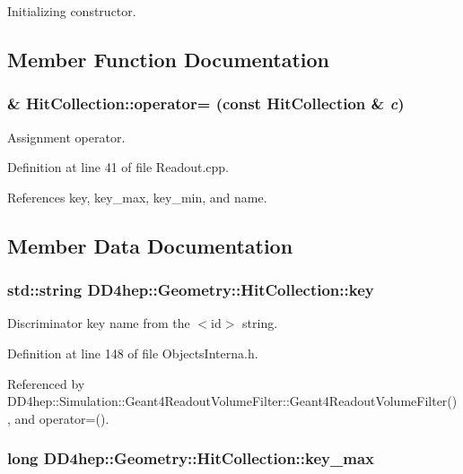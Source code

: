 Initializing constructor. 

\subsection{Member Function Documentation}
\hypertarget{class_d_d4hep_1_1_geometry_1_1_hit_collection_aaa94ed4af290c075c5e6c8fd553bb84c}{
\subsubsection[{operator=}]{ \& HitCollection::operator= (const {\bf HitCollection} \& {\em c})}}
\label{class_d_d4hep_1_1_geometry_1_1_hit_collection_aaa94ed4af290c075c5e6c8fd553bb84c}


Assignment operator. 

Definition at line 41 of file Readout.cpp.

References key, key\_\-max, key\_\-min, and name.

\subsection{Member Data Documentation}
\hypertarget{class_d_d4hep_1_1_geometry_1_1_hit_collection_a4948f37ecd677f966101a2d662412790}{
\subsubsection[{key}]{\setlength{\rightskip}{0pt plus 5cm}std::string {\bf DD4hep::Geometry::HitCollection::key}}}
\label{class_d_d4hep_1_1_geometry_1_1_hit_collection_a4948f37ecd677f966101a2d662412790}


Discriminator key name from the $<$id$>$ string. 

Definition at line 148 of file ObjectsInterna.h.

Referenced by DD4hep::Simulation::Geant4ReadoutVolumeFilter::Geant4ReadoutVolumeFilter(), and operator=().\hypertarget{class_d_d4hep_1_1_geometry_1_1_hit_collection_af307fe48c5092b585933c02e837f177d}{
\subsubsection[{key\_\-max}]{\setlength{\rightskip}{0pt plus 5cm}long {\bf DD4hep::Geometry::HitCollection::key\_\-max}}}
\label{class_d_d4hep_1_1_geometry_1_1_hit_collection_af307fe48c5092b585933c02e837f177d}


